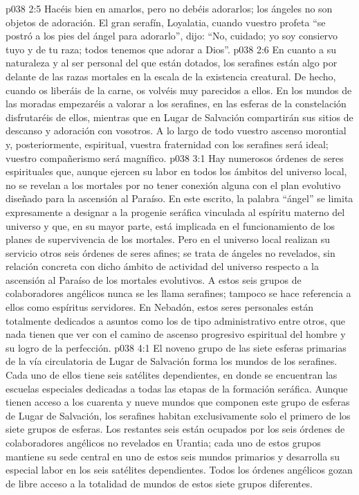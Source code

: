 \vs p038 2:5 \pc Hacéis bien en amarlos, pero no debéis adorarlos; los ángeles no son objetos de adoración. El gran serafín, Loyalatia, cuando vuestro profeta “se postró a los pies del ángel para adorarlo”, dijo: “No, cuidado; yo soy consiervo tuyo y de tu raza; todos tenemos que adorar a Dios”.
\vs p038 2:6 En cuanto a su naturaleza y al ser personal del que están dotados, los serafines están algo por delante de las razas mortales en la escala de la existencia creatural. De hecho, cuando os liberáis de la carne, os volvéis muy parecidos a ellos. En los mundos de las moradas empezaréis a valorar a los serafines, en las esferas de la constelación disfrutaréis de ellos, mientras que en Lugar de Salvación compartirán sus sitios de descanso y adoración con vosotros. A lo largo de todo vuestro ascenso morontial y, posteriormente, espiritual, vuestra fraternidad con los serafines será ideal; vuestro compañerismo será magnífico.
\vs p038 3:1 Hay numerosos órdenes de seres espirituales que, aunque ejercen su labor en todos los ámbitos del universo local, no se revelan a los mortales por no tener conexión alguna con el plan evolutivo diseñado para la ascensión al Paraíso. En este escrito, la palabra “ángel” se limita expresamente a designar a la progenie seráfica vinculada al espíritu materno del universo y que, en su mayor parte, está implicada en el funcionamiento de los planes de supervivencia de los mortales. Pero en el universo local realizan su servicio otros seis órdenes de seres afines; se trata de ángeles no revelados, sin relación concreta con dicho ámbito de actividad del universo respecto a la ascensión al Paraíso de los mortales evolutivos. A estos seis grupos de colaboradores angélicos nunca se les llama serafines; tampoco se hace referencia a ellos como espíritus servidores. En Nebadón, estos seres personales están totalmente dedicados a asuntos como los de tipo administrativo entre otros, que nada tienen que ver con el camino de ascenso progresivo espiritual del hombre y su logro de la perfección.
\vs p038 4:1 El noveno grupo de las siete esferas primarias de la vía circulatoria de Lugar de Salvación forma los mundos de los serafines. Cada uno de ellos tiene seis satélites dependientes, en donde se encuentran las escuelas especiales dedicadas a todas las etapas de la formación seráfica. Aunque tienen acceso a los cuarenta y nueve mundos que componen este grupo de esferas de Lugar de Salvación, los serafines habitan exclusivamente solo el primero de los siete grupos de esferas. Los restantes seis están ocupados por los seis órdenes de colaboradores angélicos no revelados en Urantia; cada uno de estos grupos mantiene su sede central en uno de estos seis mundos primarios y desarrolla su especial labor en los seis satélites dependientes. Todos los órdenes angélicos gozan de libre acceso a la totalidad de mundos de estos siete grupos diferentes.
